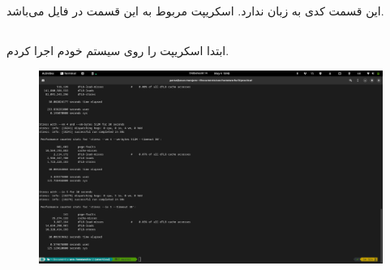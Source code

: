 \documentclass{article}
\begin{document}
\section{}
این قسمت کدی به زبان 
ندارد. اسکریپت مربوط به این قسمت در فایل 
می‌باشد. 
\subsection{}
ابتدا اسکریپت را روی سیستم خودم اجرا کردم.
\begin{figure}[H]
   \centering
   \includegraphics[width=\linewidth]{3-1.png}
\end{figure}
\end{document}
